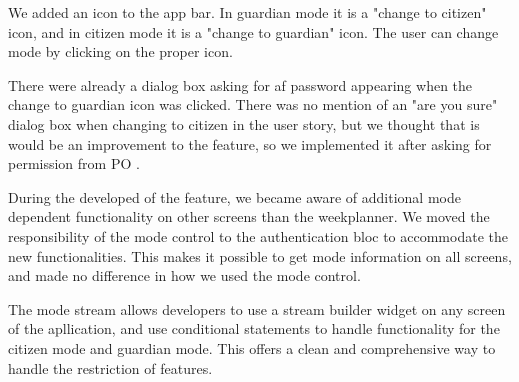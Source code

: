 We added an icon to the app bar. In guardian mode it is a "change to citizen" icon, and in citizen mode it is a "change to guardian" icon. The user can change mode by clicking on the proper icon.

There were already a dialog box asking for af password appearing when the change to guardian icon was clicked. There was no mention of an "are you sure" dialog box when changing to citizen in the user story, but we thought that is would be an improvement to the feature, so we implemented it after asking for permission from \gls{PO} .

During the developed of the feature, we became aware of additional mode dependent functionality on other screens than the weekplanner.  We moved the responsibility of the mode control to the authentication \gls{bloc} to accommodate the new functionalities. This makes it possible to get mode information on all screens, and made no difference in how we used the mode control.

The mode stream allows developers to use a stream builder widget on any screen of the apllication, and use conditional statements to handle functionality for the citizen mode and guardian mode. This offers a clean and comprehensive way to handle the restriction of features.
